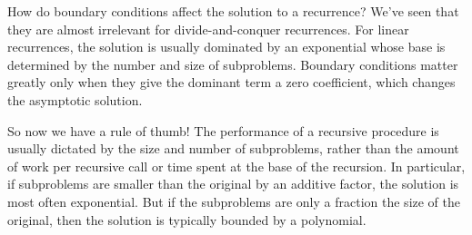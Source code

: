 How do boundary conditions affect the solution to a recurrence?  We've
seen that they are almost irrelevant for divide-and-conquer
recurrences.  For linear recurrences, the solution is usually
dominated by an exponential whose base is determined by the number and
size of subproblems.  Boundary conditions matter greatly only when
they give the dominant term a zero coefficient, which changes the
asymptotic solution.

So now we have a rule of thumb!  The performance of a recursive
procedure is usually dictated by the size and number of subproblems,
rather than the amount of work per recursive call or time spent at the
base of the recursion.  In particular, if subproblems are smaller than
the original by an additive factor, the solution is most often
exponential.  But if the subproblems are only a fraction the size of
the original, then the solution is typically bounded by a polynomial.

\endinput
